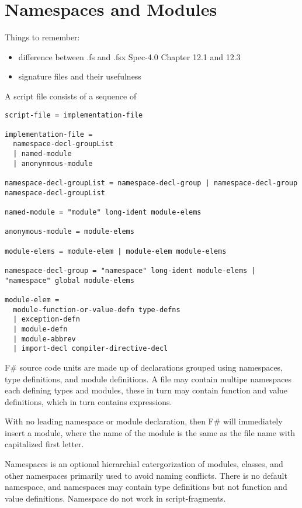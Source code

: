 \chapter{Namespaces and Modules}
\label{chap:modules}
Things to remember: 
\begin{itemize}
\item difference between .fs and .fsx Spec-4.0 Chapter 12.1 and 12.3
\item signature files and their usefulness
\end{itemize}


A script file consists of a sequence of 
\begin{lstlisting}[language=ebnf]
script-file = implementation-file

implementation-file =
  namespace-decl-groupList
  | named-module
  | anonynmous-module

namespace-decl-groupList = namespace-decl-group | namespace-decl-group namespace-decl-groupList
 
named-module = "module" long-ident module-elems

anonymous-module = module-elems

module-elems = module-elem | module-elem module-elems

namespace-decl-group = "namespace" long-ident module-elems | "namespace" global module-elems

module-elem = 
  module-function-or-value-defn type-defns
  | exception-defn
  | module-defn
  | module-abbrev
  | import-decl compiler-directive-decl
\end{lstlisting}

F\# source code units are made up of declarations grouped using namespaces, type definitions, and module definitions. A file may contain multipe namespaces each defining types and modules, these in turn may contain function and value definitions, which in turn contains expressions. 

With no leading namespace or module declaration, then F\# will immediately insert a module, where the name of the module is the same as the file name with capitalized first letter.

Namespaces is an optional hierarchial catergorization of modules, classes, and other namespaces primarily used to avoid naming conflicts. There is no default namespace, and namespaces may contain type definitions but not function and value definitions. Namespace do not work in script-fragments.


